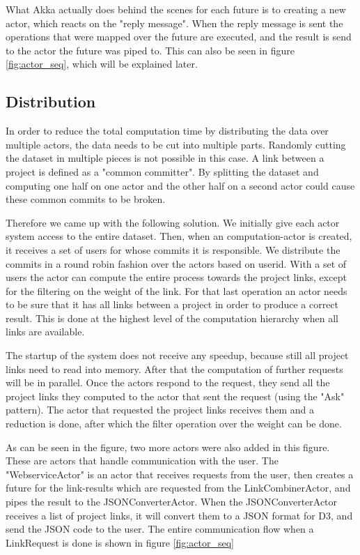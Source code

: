 \documentclass[10pt,a4paper]{article}
\begin{document}
What Akka actually does behind the scenes for each future is to creating a new actor, which reacts on the "reply message". When the reply message is sent the operations that were mapped over the future are executed, and the result is send to the actor the future was piped to. This can also be seen in figure \ref{fig:actor_seq}, which will be explained later.

\subsection{Distribution}

In order to reduce the total computation time by distributing the data over multiple actors, the data needs to be cut into multiple parts. Randomly cutting the dataset in multiple pieces is not possible in this case. A link between a project is defined as a "common committer". By splitting the dataset and computing one half on one actor and the other half on a second actor could cause these common commits to be broken. 

Therefore we came up with the following solution. We initially give each actor system access to the entire dataset. Then, when an computation-actor is created, it receives a set of users for whose commits it is responsible. We distribute the commits in a round robin fashion over the actors based on userid. With a set of users the actor can compute the entire process towards the project links, except for the filtering on the weight of the link. For that last operation an actor needs to be sure that it has all links between a project in order to produce a correct result. This is done at the highest level of the computation hierarchy when all links are available.

The startup of the system does not receive any speedup, because still all project links need to read into memory. After that the computation of further requests will be in parallel. Once the actors respond to the request, they send all the project links they computed to the actor that sent the request (using the "Ask" pattern). The actor that requested the project links receives them and a reduction is done, after which the filter operation over the weight can be done.


As can be seen in the figure, two more actors were also added in this figure. These are actors that handle communication with the user. The "WebserviceActor" is an actor that receives requests from the user, then creates a future for the link-results which are requested from the LinkCombinerActor, and pipes the result to the JSONConverterActor. When the JSONConverterActor receives a list of project links, it will convert them to a JSON format for D3, and send the JSON code to the user. The entire communication flow when a LinkRequest is done is shown in figure \ref{fig:actor_seq}
\end{document}
